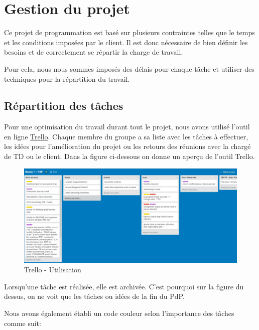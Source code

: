 \chapter{Gestion du projet}

Ce projet de programmation est basé sur plusieurs contraintes telles que le temps et les conditions imposées par le client. Il est donc nécessaire de bien définir les besoins et de correctement se répartir la charge de travail.

Pour cela, nous nous sommes imposés des délais pour chaque tâche et utiliser des techniques pour la répartition du travail.

\section{Répartition des tâches}
Pour une optimisation du travail durant tout le projet, nous avons utilisé l'outil en ligne \href{http://www.trello.com/}{Trello}.
Chaque membre du groupe a sa liste avec les tâches à effectuer, les idées pour l'amélioration du projet ou les retours des réunions avec la chargé de TD ou le client.
Dans la figure ci-dessous on donne un aperçu de l'outil Trello.

\begin{figure}[H]
  \centering
    \includegraphics[scale=0.2]{images/trello.jpg}
        \caption{Trello - Utilisation}
\end{figure}
Lorsqu'une tâche est réalisée, elle est archivée. C'est pourquoi sur la figure du dessus, on ne voit que les tâches ou idées de la fin du PdP.

Nous avons également établi un code couleur selon l'importance des tâches comme suit:

